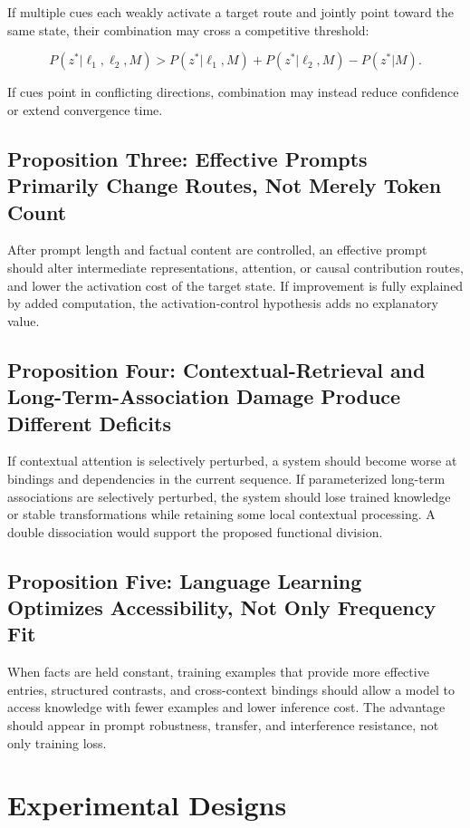 \documentclass[11pt, a4paper]{article}
\begin{document}
If multiple cues each weakly activate a target route and jointly point toward the same state, their combination may cross a competitive threshold:


\[
P(z^*|\ell_1,\ell_2,M)
>
P(z^*|\ell_1,M)
+
P(z^*|\ell_2,M)
-P(z^*|M).
\tag{20}
\]

If cues point in conflicting directions, combination may instead reduce confidence or extend convergence time.


\subsection{Proposition Three: Effective Prompts Primarily Change Routes, Not Merely Token Count}


After prompt length and factual content are controlled, an effective prompt should alter intermediate representations, attention, or causal contribution routes, and lower the activation cost of the target state. If improvement is fully explained by added computation, the activation-control hypothesis adds no explanatory value.


\subsection{Proposition Four: Contextual-Retrieval and Long-Term-Association Damage Produce Different Deficits}


If contextual attention is selectively perturbed, a system should become worse at bindings and dependencies in the current sequence. If parameterized long-term associations are selectively perturbed, the system should lose trained knowledge or stable transformations while retaining some local contextual processing. A double dissociation would support the proposed functional division.


\subsection{Proposition Five: Language Learning Optimizes Accessibility, Not Only Frequency Fit}


When facts are held constant, training examples that provide more effective entries, structured contrasts, and cross-context bindings should allow a model to access knowledge with fewer examples and lower inference cost. The advantage should appear in prompt robustness, transfer, and interference resistance, not only training loss.



\section{Experimental Designs}
\end{document}
